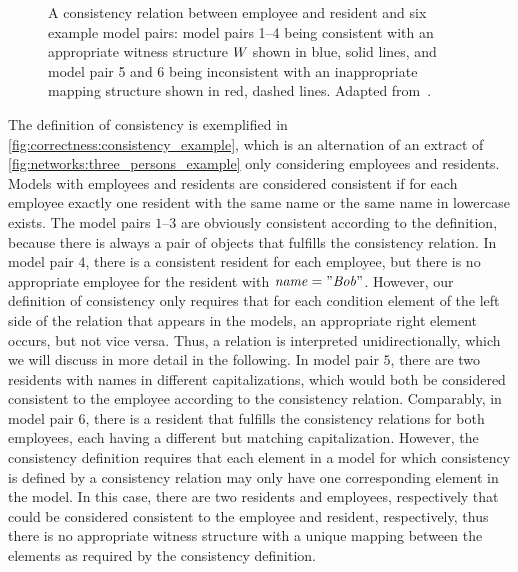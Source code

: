 \begin{figure}
    \centering
    
    \caption[Examples for fine-grained consistency relations]{A consistency relation between employee and resident and six example model pairs: model pairs 1--4 being consistent with an appropriate witness structure $\consistencyrelation{W}{}$ shown in blue, solid lines, and model pair 5 and 6 being inconsistent with an inappropriate mapping structure shown in red, dashed lines. Adapted from~.}
    \label{fig:correctness:consistency_example}
\end{figure}

\begin{example}
The definition of consistency is exemplified in \autoref{fig:correctness:consistency_example}, which is an alternation of an extract of \autoref{fig:networks:three_persons_example} only considering employees and residents. Models with employees and residents are considered consistent if for each employee exactly one resident with the same name or the same name in lowercase exists.
The model pairs $1$--$3$ are obviously consistent according to the definition, because there is always a pair of objects that fulfills the consistency relation.
In model pair $4$, there is a consistent resident for each employee, but there is no appropriate employee for the resident with $\mathit{name} = "\mathit{Bob}"$. However, our definition of consistency only requires that for each condition element of the left side of the relation that appears in the models, an appropriate right element occurs, but not vice versa. Thus, a relation is interpreted unidirectionally, which we will discuss in more detail in the following.
In model pair $5$, there are two residents with names in different capitalizations, which would both be considered consistent to the employee according to the consistency relation.
Comparably, in model pair $6$, there is a resident that fulfills the consistency relations for both employees, each having a different but matching capitalization. 
However, the consistency definition requires that each element in a model for which consistency is defined by a consistency relation may only have one corresponding element %
in the model. 
In this case, there are two residents and employees, respectively that could be considered consistent to the employee and resident, respectively, thus there is no appropriate witness structure with a unique mapping between the elements as required by the consistency definition.
\end{example}

